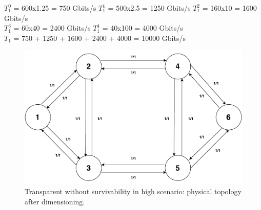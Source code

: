 $T_1^0$ = 600x1.25 = 750 Gbits/s \qquad
$T_1^1$ = 500x2.5 = 1250 Gbits/s \qquad
$T_1^2$ = 160x10 = 1600 Gbits/s \\

$T_1^3$ = 60x40 = 2400 Gbits/s \quad
$T_1^4$ = 40x100 = 4000 Gbits/s \\

$T_{1}$ = 750 + 1250 + 1600 + 2400 + 4000 = 10000 Gbits/s \qquad \\

\begin{figure}[H]
	\centering
	\includegraphics[width=15cm]{sdf/heuristic/transparent/figures/physicalTopology_low_traffic}
	\caption{Transparent without survivability in high scenario: physical topology after dimensioning.}
	\label{physical_topology_medium_traffic}
\end{figure}


